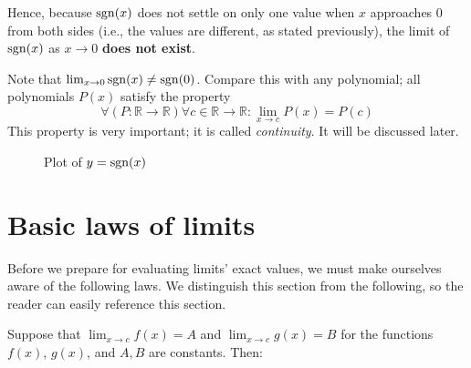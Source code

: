 Hence, because $\operatorname{sgn}(x)$ does not settle on only one value when $x$ approaches $0$ from both sides
(i.e., the values are different, as stated previously), the limit of $\operatorname{sgn}(x)$ as $x \to 0$ \textbf{does
not exist}.

Note that $\lim_{x \to 0} \operatorname{sgn}(x) \ne \operatorname{sgn}(0)$. Compare this with any polynomial; all polynomials $P(x)$
satisfy the property \[\forall (P : \mathbb{R} \to \mathbb{R}) \forall c \in \mathbb{R} \to \mathbb{R} : \lim_{x \to c} P(x) = P(c)\]
This property is very important; it is called \textit{continuity}. It will be discussed later.

\begin{figure}
    \centering
    \caption{Plot of $y = \operatorname{sgn}(x)$}
    \label{fig:sgn}
\end{figure}

\newpage

\section{Basic laws of limits}
Before we prepare for evaluating limits' exact values, we must make ourselves aware of the following laws.
We distinguish this section from the following, so the reader can easily reference this section.

Suppose that $\lim_{x \to c} f(x) = A$ and $\lim_{x \to c} g(x) = B$ for the functions $f(x)$, $g(x)$,
and $A,B$ are constants. Then:

